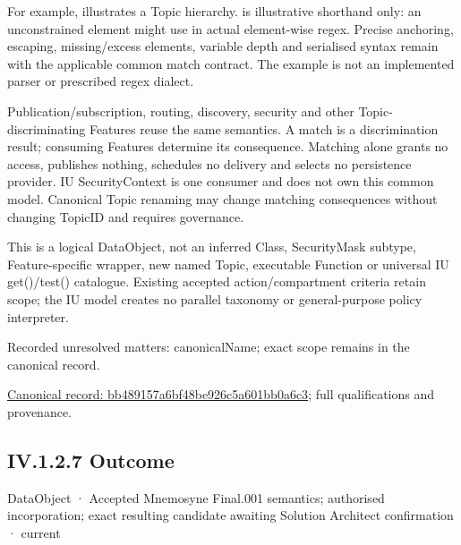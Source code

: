 For example, \texttt{}
illustrates a Topic hierarchy. \texttt{}
is illustrative shorthand only: an unconstrained element might use \texttt{} in actual
element-wise regex. Precise anchoring, escaping, missing/excess elements, variable
depth and serialised syntax remain with the applicable common match contract.
The example is not an implemented parser or prescribed regex dialect.



Publication/subscription, routing, discovery, security and other Topic-discriminating
Features reuse the same semantics. A match is a discrimination result; consuming
Features determine its consequence. Matching alone grants no access, publishes
nothing, schedules no delivery and selects no persistence provider. IU SecurityContext
is one consumer and does not own this common model. Canonical Topic renaming may
change matching consequences without changing TopicID and requires governance.



This is a logical DataObject, not an inferred Class, SecurityMask subtype,
Feature-specific wrapper, new named Topic, executable Function or universal IU
get()/test() catalogue. Existing accepted action/compartment criteria retain scope;
the IU model creates no parallel taxonomy or general-purpose policy interpreter.


{\small Recorded unresolved matters: canonicalName; exact scope remains in the canonical record.}\par
{\footnotesize \href{../../../../../../../continuum/application/data-object/bb489157a6bf48be926c5a601bb0a6c3.md}{Canonical record: bb489157a6bf48be926c5a601bb0a6c3}; full qualifications and provenance.}\par
\subsection*{IV.1.2.7 Outcome}
\label{navigation:IV.1.2.7}

\label{element:6d43c35381a9438f9101cf1d8b530b19}
{\small DataObject · Accepted Mnemosyne Final.001 semantics; authorised incorporation; exact resulting candidate awaiting Solution Architect confirmation · current}\par

